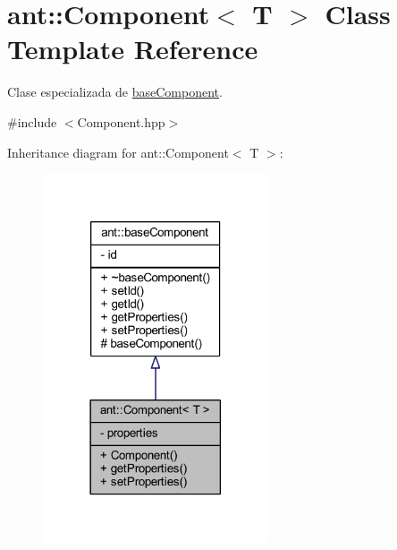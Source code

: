 \hypertarget{classant_1_1_component}{\section{ant\+:\+:Component$<$ T $>$ Class Template Reference}
\label{classant_1_1_component}
}


Clase especializada de \hyperlink{classant_1_1base_component}{base\+Component}.  




{\ttfamily \#include $<$Component.\+hpp$>$}



Inheritance diagram for ant\+:\+:Component$<$ T $>$\+:
\nopagebreak
\begin{figure}[H]
\begin{center}
\leavevmode
\includegraphics[width=189pt]{dd/d7d/classant_1_1_component__inherit__graph}
\end{center}
\end{figure}


